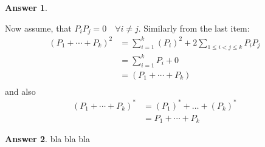\documentclass[12pt]{article}
\theoremstyle{plain}
\theoremstyle{definition}
\newtheorem{ans}{Answer}
\begin{document}
\begin{ans}
\begin{enumerate}[(a)]
			Now assume, that $ P_iP_j = 0 \quad \forall i \neq j$. Similarly from the last item:
			\begin{align*}
				(P_1 + \cdots + P_k)^2 &= \sum_{i=1}^{k} (P_i)^2 + 2\sum_{1 \leq i < j \leq k}P_iP_j&\\
				&= \sum_{i=1}^{k} P_i  + 0&\\
				&= (P_1 + \cdots + P_k)&\\
			\end{align*}
			and also
			\begin{align*}
				(P_1 + \cdots + P_k)^{*} &= (P_1)^{*} + \dots + (P_k)^{*}&\\
				&= P_1 + \cdots + P_k
			\end{align*}
	\end{enumerate}
\end{ans}

\noindent \hrulefill

\begin{ans}
 bla bla bla
\end{ans}
\end{document}
